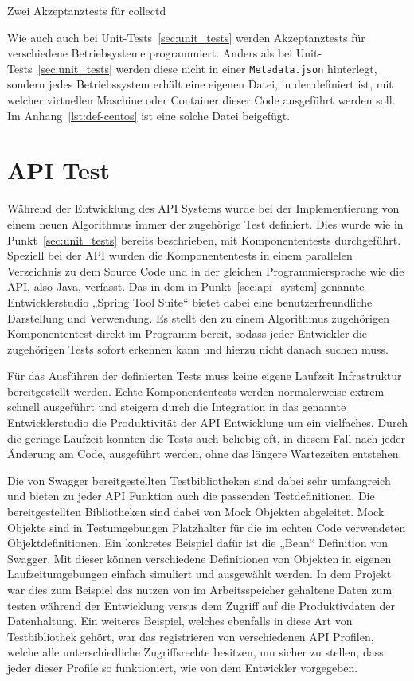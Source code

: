\begin{listing}
  \inputminted{ruby}{../listings/acceptance-test.txt}
  \caption{Zwei Akzeptanztests für collectd}
\end{listing}

Wie auch auch bei Unit-Tests~\ref{sec:unit_tests} werden Akzeptanztests für
verschiedene Betriebsysteme programmiert. Anders als bei
Unit-Tests~\ref{sec:unit_tests} werden diese nicht in einer
\texttt{Metadata.json} hinterlegt, sondern jedes Betriebssystem erhält eine
eigenen Datei, in der definiert ist, mit welcher virtuellen Maschine oder
Container dieser Code ausgeführt werden soll. Im Anhang~\ref{lst:def-centos}
ist eine solche Datei beigefügt.
\mr%

\section{API Test}
\label{sec:api_test}
Während der Entwicklung des API Systems wurde bei der Implementierung von einem
neuen Algorithmus immer der zugehörige Test definiert. Dies wurde wie in
Punkt~\ref{sec:unit_tests} bereits beschrieben, mit Komponententests
durchgeführt. Speziell bei der API wurden die Komponententests in einem
parallelen Verzeichnis zu dem Source Code und in der gleichen
Programmiersprache wie die API, also Java, verfasst. Das in dem in
Punkt~\ref{sec:api_system} genannte Entwicklerstudio „Spring Tool Suite“ bietet
dabei eine benutzerfreundliche Darstellung und Verwendung. Es stellt den zu
einem Algorithmus zugehörigen Komponententest direkt im Programm bereit, sodass
jeder Entwickler die zugehörigen Tests sofort erkennen kann und hierzu nicht
danach suchen muss.

Für das Ausführen der definierten Tests muss keine eigene Laufzeit
Infrastruktur bereitgestellt werden. Echte Komponententests werden
normalerweise extrem schnell ausgeführt und steigern durch die Integration in
das genannte Entwicklerstudio die Produktivität der API Entwicklung um ein
vielfaches. Durch die geringe Laufzeit konnten die Tests auch beliebig oft, in
diesem Fall nach jeder Änderung am Code, ausgeführt werden, ohne das längere
Wartezeiten entstehen.

Die von Swagger bereitgestellten Testbibliotheken sind dabei sehr umfangreich
und bieten zu jeder API Funktion auch die passenden Testdefinitionen. Die
bereitgestellten Bibliotheken sind dabei von Mock Objekten abgeleitet. Mock
Objekte sind in Testumgebungen Platzhalter für die im echten Code verwendeten
Objektdefinitionen. Ein konkretes Beispiel dafür ist die „Bean“ Definition von
Swagger. Mit dieser können verschiedene Definitionen von Objekten in eigenen
Laufzeitumgebungen einfach simuliert und ausgewählt werden. In dem Projekt war
dies zum Beispiel das nutzen von im Arbeitsspeicher gehaltene Daten zum testen
während der Entwicklung versus dem Zugriff auf die Produktivdaten der
Datenhaltung. Ein weiteres Beispiel, welches ebenfalls in diese Art von
Testbibliothek gehört, war das registrieren von verschiedenen API Profilen,
welche alle unterschiedliche Zugriffsrechte besitzen, um sicher zu stellen,
dass jeder dieser Profile so funktioniert, wie von dem Entwickler vorgegeben.

